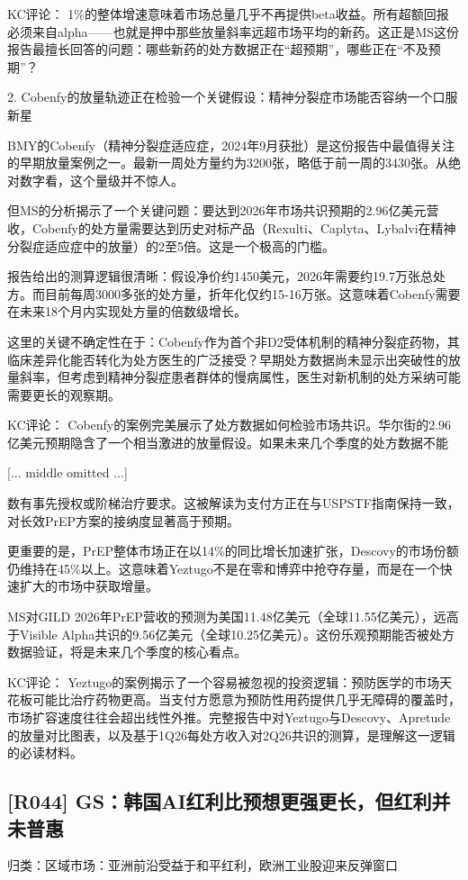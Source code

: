 \documentclass[11pt]{ctexart}
\begin{document}
KC评论： 1\%的整体增速意味着市场总量几乎不再提供beta收益。所有超额回报必须来自alpha——也就是押中那些放量斜率远超市场平均的新药。这正是MS这份报告最擅长回答的问题：哪些新药的处方数据正在“超预期”，哪些正在“不及预期”？

2. Cobenfy的放量轨迹正在检验一个关键假设：精神分裂症市场能否容纳一个口服新星

BMY的Cobenfy（精神分裂症适应症，2024年9月获批）是这份报告中最值得关注的早期放量案例之一。最新一周处方量约为3200张，略低于前一周的3430张。从绝对数字看，这个量级并不惊人。

但MS的分析揭示了一个关键问题：要达到2026年市场共识预期的2.96亿美元营收，Cobenfy的处方量需要达到历史对标产品（Rexulti、Caplyta、Lybalvi在精神分裂症适应症中的放量）的2至5倍。这是一个极高的门槛。

报告给出的测算逻辑很清晰：假设净价约1450美元，2026年需要约19.7万张总处方。而目前每周3000多张的处方量，折年化仅约15-16万张。这意味着Cobenfy需要在未来18个月内实现处方量的倍数级增长。

这里的关键不确定性在于：Cobenfy作为首个非D2受体机制的精神分裂症药物，其临床差异化能否转化为处方医生的广泛接受？早期处方数据尚未显示出突破性的放量斜率，但考虑到精神分裂症患者群体的慢病属性，医生对新机制的处方采纳可能需要更长的观察期。

KC评论： Cobenfy的案例完美展示了处方数据如何检验市场共识。华尔街的2.96亿美元预期隐含了一个相当激进的放量假设。如果未来几个季度的处方数据不能

[... middle omitted ...]

数有事先授权或阶梯治疗要求。这被解读为支付方正在与USPSTF指南保持一致，对长效PrEP方案的接纳度显著高于预期。

更重要的是，PrEP整体市场正在以14\%的同比增长加速扩张，Descovy的市场份额仍维持在45\%以上。这意味着Yeztugo不是在零和博弈中抢夺存量，而是在一个快速扩大的市场中获取增量。

MS对GILD 2026年PrEP营收的预测为美国11.48亿美元（全球11.55亿美元），远高于Visible Alpha共识的9.56亿美元（全球10.25亿美元）。这份乐观预期能否被处方数据验证，将是未来几个季度的核心看点。

KC评论： Yeztugo的案例揭示了一个容易被忽视的投资逻辑：预防医学的市场天花板可能比治疗药物更高。当支付方愿意为预防性用药提供几乎无障碍的覆盖时，市场扩容速度往往会超出线性外推。完整报告中对Yeztugo与Descovy、Apretude的放量对比图表，以及基于1Q26每处方收入对2Q26共识的测算，是理解这一逻辑的必读材料。

\subsection{[R044] GS：韩国AI红利比预想更强更长，但红利并未普惠}
{\small\color{refgray}归类：区域市场：亚洲前沿受益于和平红利，欧洲工业股迎来反弹窗口}
\end{document}
